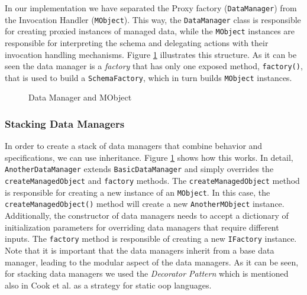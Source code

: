 In our implementation we have separated the Proxy factory (\texttt{DataManager}) from the Invocation Handler (\texttt{MObject}).
This way, the \texttt{DataManager} class is responsible for creating proxied instances of managed data, while the \texttt{MObject} instances are responsible for interpreting the schema and delegating actions with their invocation handling mechanisms. 
Figure \ref{fig:DataManager_and_MObject} illustrates this structure.
As it can be seen the data manager is a \textit{factory} that has only one exposed method, \texttt{factory()}, that is used to build a \texttt{SchemaFactory}, which in turn builds \texttt{MObject} instances.

\begin{figure}[H]
	\centering
  	\caption{Data Manager and MObject}
  	\label{fig:DataManager_and_MObject}
\end{figure}

\subsubsection{Stacking Data Managers}
In order to create a stack of data managers that combine behavior and specifications, we can use inheritance.
Figure \ref{fig:DataManager_and_MObject} shows how this works.
In detail, \texttt{AnotherDataManager} extends \texttt{BasicDataManager} and simply overrides the \texttt{createManagedObject} and \texttt{factory} methods.
The \texttt{createManagedObject} method is responsible for creating a new instance of an \texttt{MObject}.
In this case, the \texttt{createManagedObject()} method will create a new \texttt{AnotherMObject} instance.
Additionally, the constructor of data managers needs to accept a dictionary of initialization parameters for overriding data managers that require different inputs.
The \texttt{factory} method is responsible of creating a new \texttt{IFactory} instance.
Note that it is important that the data managers inherit from a base data manager, leading to the modular aspect of the data managers.
As it can be seen, for stacking data managers we used the \textit{Decorator Pattern} \cite{gamma1995design} which is mentioned also in Cook et al. \cite{loh2012managed} as a strategy for static \ac{oop} languages.

